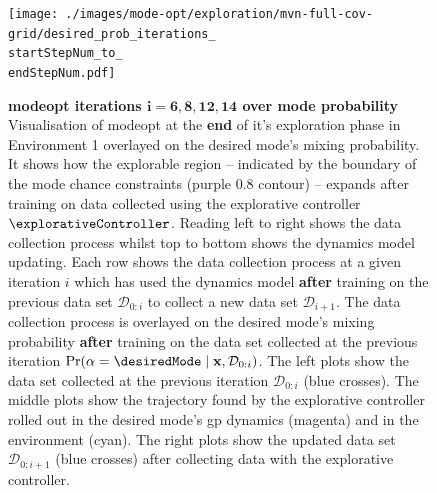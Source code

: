 \documentclass{mimosis-class/mimosis}
\numberwithin{equation}{chapter}
\newcommand{\state}{\ensuremath{\mathbf{x}}}
\newcommand{\dataset}{\ensuremath{\mathcal{D}}}
\newcommand{\modeVar}{\ensuremath{\alpha}}
\begin{document}
{\renewcommand{\startStepNum}{6}
\renewcommand{\endStepNum}{14}
\begin{figure}
\centering
\texttt{[image: ./images/mode-opt/exploration/mvn-full-cov-grid/desired\_prob\_iterations\_\\startStepNum\_to\_\\endStepNum.pdf]}
\caption[\acrshort{modeopt} iterations $\mathbf{i=6, 8, 12, 14}$ over mode probability]{\textbf{\acrshort{modeopt} iterations $\mathbf{i=6, 8, 12, 14}$ over mode probability}
Visualisation of \acrshort{modeopt} at the \textbf{end} of it's exploration phase in Environment 1 overlayed
on the desired mode's mixing probability.
It shows how the explorable region -- indicated by the boundary of the mode chance constraints (purple 0.8 contour)
-- expands after training on data collected using the explorative controller $\explorativeController$.
Reading left to right shows the data collection process whilst top to bottom shows the dynamics model updating.
Each row shows the data collection process at a given iteration $i$ which has used the dynamics model
\textbf{after} training on the previous data set $\mathcal{D}_{0:i}$ to collect a new data set $\dataset_{i+1}$.
The data collection process is overlayed on the desired mode's mixing probability \textbf{after} training on the
data set collected at the previous iteration $\Pr(\modeVar=\desiredMode \mid \state, \dataset_{0:i})$.
The left plots show the data set collected at the previous iteration $\dataset_{0:i}$ (blue crosses).
The middle plots show the trajectory found by the explorative controller rolled out in the desired mode's \acrshort{gp}
dynamics (magenta) and in the environment (cyan).
The right plots show the updated data set $\dataset_{0:i+1}$ (blue crosses) after collecting data with the explorative
controller.}
\label{fig-explorative-traj-opt-over-prob-7-\startStepNum-\endStepNum}
\end{figure}

}
\end{document}
